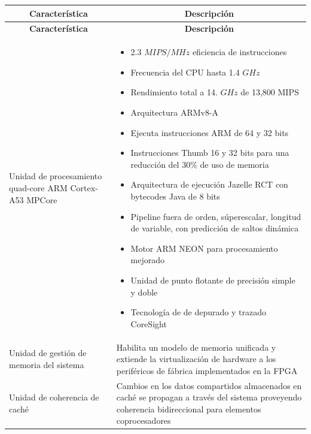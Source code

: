 \begin{longtable}{p{} | p{}}

\toprule
\multicolumn{1}{c}{\textbf{Caracter\'istica}} & \multicolumn{1}{c}{\textbf{Descripción}} \\
\toprule
\endfirsthead

\toprule
\multicolumn{1}{c}{\textbf{Caracter\'istica}} & \multicolumn{1}{c}{\textbf{Descripción}} \\
\toprule
\endhead

Unidad de procesamiento quad-core ARM Cortex-A53 MPCore &
\begin{itemize}
  \item 2.3 $MIPS/MHz$ eficiencia de instrucciones
  \item Frecuencia del CPU hasta 1.4 $GHz$
  \item Rendimiento total a 14. $GHz$ de 13,800 MIPS
  \item Arquitectura ARMv8-A
  \item Ejecuta instrucciones ARM de 64 y 32 bits
  \item Instrucciones Thumb 16 y 32 bits para una reducci\'on del 30\% de uso de memoria
  \item Arquitectura de ejecuci\'on Jazelle RCT con bytecodes Java de 8 bits
  \item Pipeline fuera de orden, s\'uperescalar, longitud de variable, con predicción de saltos din\'amica
  \item Motor ARM NEON para procesamiento mejorado
  \item Unidad de punto flotante de precisi\'on simple y doble
  \item Tecnolog\'ia de de depurado y trazado CoreSight
\end{itemize} \\ \midrule

Unidad de gestión de memoria del sistema &

 Habilita un modelo de memoria unificada y extiende la virtualización de hardware a los periféricos de f\'abrica implementados en la FPGA \\ \midrule

Unidad de coherencia de caché &
 Cambios en los datos compartidos almacenados en cach\'e se propagan a trav\'es del sistema proveyendo coherencia bidireccional para elementos coprocesadores \\ \midrule


\end{longtable}

